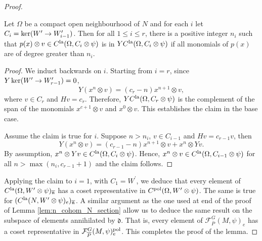 \documentclass[10pt]{amsart}
\begin{document}
\begin{proof}
\begin{claim}
Let $\Omega$ be a compact open neighbourhood of $N$ and for each $i$ let $C_{i}=\ker(W^{\prime}\rightarrow W_{i-1}^{\prime})$. Then for all $1\leq i \leq r$, there is a positive integer $n_{i}$ such that $p(x)\otimes v \in C^{\textnormal{la}}(\Omega,C_{i}\otimes\psi)$ is in $YC^{\textnormal{la}}(\Omega,C_{i}\otimes\psi)$ if all monomials of $p(x)$ are of degree greater than $n_{i}$. 
\end{claim}
\begin{proof}
We induct backwards on $i$. Starting from $i=r$, since $Y\ker(W^{\prime}\rightarrow W_{r-1}^{\prime})=0$, \[
    Y(x^n\otimes v) = (c_{r}-n)x^{n+1}\otimes v,
\] where $v\in C_{r}$ and $Hv=c_{r}$. Therefore, $YC^{\textnormal{la}}(\Omega,C_{r}\otimes\psi)$ is the complement of the span of the monomials $x^{c+1}\otimes v$ and $x^{0}\otimes v$. This establishes the claim in the base case. 

Assume the claim is true for $i$. Suppose $n>n_{i}$, $v\in C_{i-1}$ and $Hv=c_{r-1}v$, then \[
    Y(x^n\otimes v) = (c_{r-1}-n)x^{n+1}\otimes v + x^{n}\otimes Yv.
\] By assumption, $x^{n}\otimes Yv\in C^{\textnormal{la}}(\Omega,C_{i}\otimes\psi)$. Hence, $x^{n}\otimes v\in C^{\textnormal{la}}(\Omega,C_{i-1}\otimes\psi)$ for all $n > \max(n_{i},c_{r-1}+1)$ and the claim follows. 
\end{proof}

Applying the claim to $i=1$, with $C_{1}=W^{\prime}$, we deduce that every element of $C^{\textnormal{la}}(\Omega,W^{\prime}\otimes\psi)_{\overline{\mathfrak{n}}}$ has a coset representative in $C^{\textnormal{pol}}(\Omega,W^{\prime}\otimes\psi)$. The same is true for $(C^{\textnormal{la}}(N,W^{\prime}\otimes\psi)_{e})_{\overline{\mathfrak{n}}}$. A similar argument as the one used at end of the proof of Lemma \ref{lem:n_cohom_N_section} allow us to deduce the same result on the subspace of elements annihilated by $\mathfrak{d}$. That is, every element of $\mathcal{F}_{\overline{P}}^{G}(M,\psi)_{e}$ has a coset representative in $\mathcal{F}_{\overline{P}}^{G}(M,\psi)^{\textnormal{pol}}_{e}$. This completes the proof of the lemma. 
\end{proof}
\end{document}
